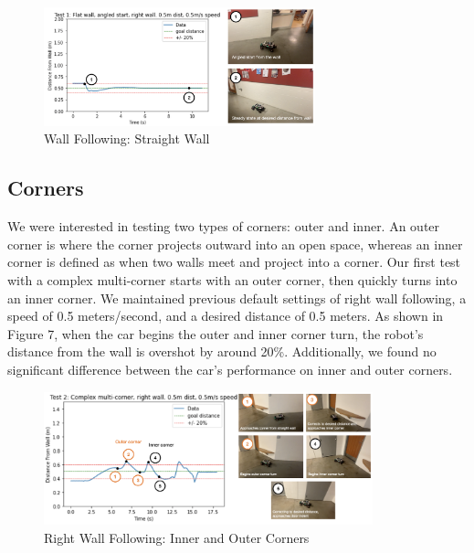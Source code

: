 \documentclass{article}
\begin{document}
\begin{figure}[H]
\begin{center}
\includegraphics[width=0.7\textwidth]{wall_follower_figure.png} %
\caption{Wall Following: Straight Wall}
\end{center}
\label{workflow}
\end{figure}

\subsection{Corners}
We were interested in testing two types of corners: outer and inner. An outer corner is where the corner projects outward into an open space, whereas an inner corner is defined as when two walls meet and project into a corner. Our first test with a complex multi-corner starts with an outer corner, then quickly turns into an inner corner. We maintained previous default settings of right wall following, a speed of 0.5 meters/second, and a desired distance of 0.5 meters. As shown in Figure 7, when the car begins the outer and inner corner turn, the robot's distance from the wall is overshot by around 20\%. Additionally, we found no significant difference between the car's performance on inner and outer corners.

\begin{figure}[H]
\begin{center}
\includegraphics[width=0.85\textwidth]{corners_figure.png} %
\caption{Right Wall Following: Inner and Outer Corners}
\end{center}
\label{plot}
\end{figure}
\end{document}
